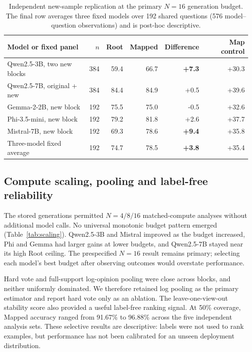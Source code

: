 \documentclass[11pt]{article}
\begin{document}
\begin{table}[H]
\centering\small
\caption{Independent new-sample replication at the primary $N=16$ generation budget. The final row averages three fixed models over 192 shared questions (576 model--question observations) and is post-hoc descriptive.}
\label{tab:replication}
\begin{tabular}{lrrrrr}
\toprule
Model or fixed panel & $n$ & Root & Mapped & Difference & Map control \\
\midrule
Qwen2.5-3B, two new blocks & 384 & 59.4 & 66.7 & \textbf{+7.3} & +30.3 \\
Qwen2.5-7B, original + new & 384 & 84.4 & 84.9 & +0.5 & +39.6 \\
Gemma-2-2B, new block & 192 & 75.5 & 75.0 & -0.5 & +32.6 \\
Phi-3.5-mini, new block & 192 & 79.2 & 81.8 & +2.6 & +37.7 \\
Mistral-7B, new block & 192 & 69.3 & 78.6 & \textbf{+9.4} & +35.8 \\
Three-model fixed average & 192 & 74.7 & 78.5 & \textbf{+3.8} & +35.4 \\
\bottomrule
\end{tabular}
\end{table}

\subsection{Compute scaling, pooling and label-free reliability}

The stored generations permitted $N=4/8/16$ matched-compute analyses without additional model calls. No universal monotonic budget pattern emerged (Table~\ref{tab:scaling}). Qwen2.5-3B and Mistral improved as the budget increased, Phi and Gemma had larger gains at lower budgets, and Qwen2.5-7B stayed near its high Root ceiling. The prespecified $N=16$ result remains primary; selecting each model's best budget after observing outcomes would overstate performance.

Hard vote and full-support log-opinion pooling were close across blocks, and neither uniformly dominated. We therefore retained log pooling as the primary estimator and report hard vote only as an ablation. The leave-one-view-out stability score also provided a useful label-free ranking signal. At 50\% coverage, Mapped accuracy ranged from 91.67\% to 96.88\% across the five independent analysis sets. These selective results are descriptive: labels were not used to rank examples, but performance has not been calibrated for an unseen deployment distribution.
\end{document}
